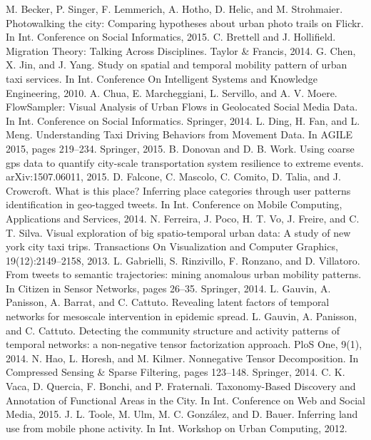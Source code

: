 \documentclass[a4paper, 10pt, conference]{ieeeconf}      %
\begin{document}
\begin{thebibliography}{99}

\bibitem{} M. Becker, P. Singer, F. Lemmerich, A. Hotho, D. Helic, and M. Strohmaier. Photowalking the city: Comparing hypotheses about urban photo trails on Flickr. In Int. Conference on Social Informatics, 2015.
\bibitem{} C. Brettell and J. Hollifield. Migration Theory: Talking Across Disciplines. Taylor \& Francis, 2014.
\bibitem{} G. Chen, X. Jin, and J. Yang. Study on spatial and temporal mobility pattern of urban taxi services. In Int. Conference On Intelligent Systems and Knowledge Engineering, 2010.
\bibitem{} A. Chua, E. Marcheggiani, L. Servillo, and A. V. Moere. FlowSampler: Visual Analysis of Urban Flows in Geolocated Social Media Data. In Int. Conference on Social Informatics. Springer, 2014.
\bibitem{} L. Ding, H. Fan, and L. Meng. Understanding Taxi Driving Behaviors from Movement Data. In AGILE 2015, pages 219–234. Springer, 2015.
\bibitem{}B. Donovan and D. B. Work. Using coarse gps data to quantify city-scale transportation system resilience to extreme events. arXiv:1507.06011, 2015.
\bibitem{}D. Falcone, C. Mascolo, C. Comito, D. Talia, and J. Crowcroft. What is this place? Inferring place categories through user patterns identification in geo-tagged tweets. In Int. Conference on Mobile Computing, Applications and Services, 2014.
\bibitem{}N. Ferreira, J. Poco, H. T. Vo, J. Freire, and C. T. Silva. Visual exploration of big spatio-temporal urban data: A study of new york city taxi trips. Transactions On Visualization and Computer Graphics, 19(12):2149–2158, 2013.
\bibitem{}L. Gabrielli, S. Rinzivillo, F. Ronzano, and D. Villatoro. From tweets to semantic trajectories: mining anomalous urban mobility patterns. In Citizen in Sensor Networks, pages 26–35. Springer, 2014.
\bibitem{}L. Gauvin, A. Panisson, A. Barrat, and C. Cattuto. Revealing latent factors of temporal networks for mesoscale intervention in epidemic spread.
\bibitem{}L. Gauvin, A. Panisson, and C. Cattuto. Detecting the community structure and activity patterns of temporal networks: a non-negative tensor factorization approach. PloS One, 9(1), 2014.
\bibitem{}N. Hao, L. Horesh, and M. Kilmer. Nonnegative Tensor Decomposition. In Compressed Sensing \& Sparse Filtering, pages 123–148. Springer, 2014.
\bibitem{}C. K. Vaca, D. Quercia, F. Bonchi, and P. Fraternali. Taxonomy-Based Discovery and Annotation of Functional Areas in the City. In Int. Conference on Web and Social Media, 2015.
\bibitem{}J. L. Toole, M. Ulm, M. C. González, and D. Bauer. Inferring land use from mobile phone activity. In Int. Workshop on Urban Computing, 2012.

\end{thebibliography}
\end{document}
